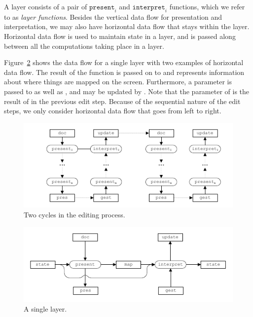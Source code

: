 \documentclass[preprint,natbib]{sigplanconf}
\begin{document}
A layer consists of a pair of $\mathtt{present}_i$ and $\mathtt{interpret}_i$ functions, which we refer to as {\em layer functions}. Besides the vertical data flow for presentation and interpretation, we may also have horizontal data flow that stays within the layer. Horizontal data flow is used to maintain state in a layer, and is passed along between all the computations taking place in a layer.


Figure~\ref{simplesinglelayer} shows the data flow for a single layer with two examples of horizontal data flow. The result  of the function  is passed on to  and represents information about where things are mapped on the screen. Furthermore, a  parameter is passed to  as well as , and may be updated by . Note that the  parameter of  is the result of  in the previous edit step. Because of the sequential nature of the edit steps, we only consider horizontal data flow that goes from left to right.





\begin{figure}
\includegraphics[width=\columnwidth]{images/EditCycles}
\caption{Two cycles in the editing process.}\label{simpleeditprocess} 
\end{figure}



\begin{figure}
\includegraphics[width=\columnwidth]{images/SingleLayer}
\caption{A single layer.}\label{simplesinglelayer} 
\end{figure}
\end{document}
